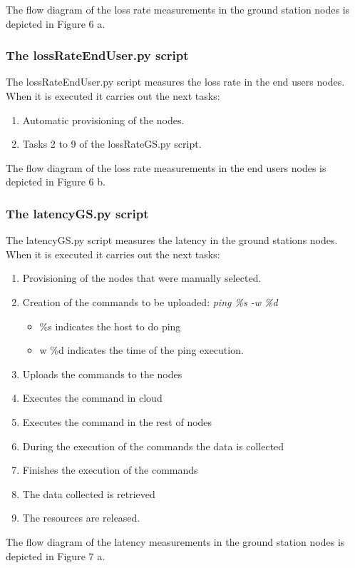 The flow diagram of the loss rate measurements in the ground station nodes is
depicted in Figure 6 a.

\subsubsection{The lossRateEndUser.py script}

The lossRateEndUser.py  script measures the loss rate in the end users
nodes. When it is executed it carries out the next tasks:
\begin{enumerate}
\item Automatic provisioning of the nodes.
\item Tasks 2 to 9 of the lossRateGS.py script.
\end{enumerate}
The flow diagram of the loss rate measurements in the end users nodes is
depicted in Figure 6 b.

\subsubsection{The latencyGS.py script}

The latencyGS.py  script measures the latency  in the ground stations
nodes. When it is executed it carries out the next tasks:
\begin{enumerate}

\item Provisioning of the nodes that were manually selected.
\item Creation of the commands to be uploaded:
\emph{ping \%s -w \%d}
\begin{itemize}
\item \%s indicates the host to do ping
\item w \%d indicates the time of the ping execution. 
\end{itemize}
\item Uploads the commands to the nodes
\item Executes the command in cloud
\item Executes the command in the rest of nodes
\item During the execution of the commands the data is collected
\item Finishes the execution of the commands 
\item The data collected is retrieved 
\item The resources are released.
\end{enumerate}

The flow diagram of the latency measurements in the ground station nodes is depicted in Figure 7 a.
 
